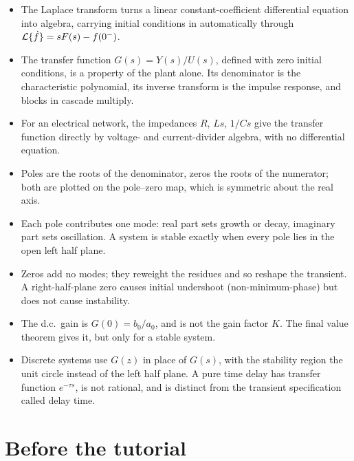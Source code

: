 \documentclass[11pt,a4paper]{article}
\begin{document}
\begin{itemize}
\item The Laplace transform turns a linear constant-coefficient differential
      equation into algebra, carrying initial conditions in automatically
      through $\mathcal{L}\{\dot f\}=sF(s)-f(0^-)$.
\item The transfer function $G(s)=Y(s)/U(s)$, defined with zero initial
      conditions, is a property of the plant alone. Its denominator is the
      characteristic polynomial, its inverse transform is the impulse response,
      and blocks in cascade multiply.
\item For an electrical network, the impedances $R$, $Ls$, $1/Cs$ give the
      transfer function directly by voltage- and current-divider algebra, with
      no differential equation.
\item Poles are the roots of the denominator, zeros the roots of the numerator;
      both are plotted on the pole--zero map, which is symmetric about the real
      axis.
\item Each pole contributes one mode: real part sets growth or decay, imaginary
      part sets oscillation. A system is stable exactly when every pole lies in
      the open left half plane.
\item Zeros add no modes; they reweight the residues and so reshape the
      transient. A right-half-plane zero causes initial undershoot
      (non-minimum-phase) but does not cause instability.
\item The d.c.\ gain is $G(0)=b_0/a_0$, and is not the gain factor $K$. The
      final value theorem gives it, but only for a stable system.
\item Discrete systems use $G(z)$ in place of $G(s)$, with the stability region
      the unit circle instead of the left half plane. A pure time delay has
      transfer function $e^{-\tau s}$, is not rational, and is distinct from
      the transient specification called delay time.
\end{itemize}

\section*{Before the tutorial}
\end{document}
